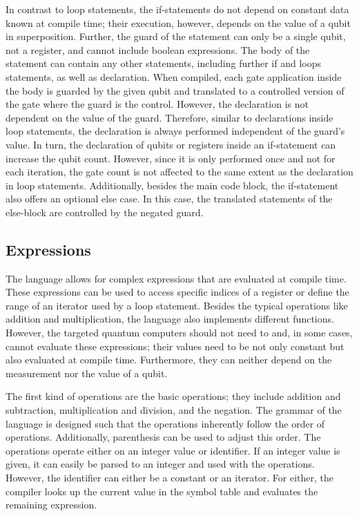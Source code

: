 In contrast to loop statements, the if-statements do not depend on constant data known at compile time; their execution, however, depends on the value of a qubit in superposition. Further, the guard of the statement can only be a single qubit, not a register, and cannot include boolean expressions.
The body of the statement can contain any other statements, including further if and loops statements, as well as declaration. When compiled, each gate application inside the body is guarded by the given qubit and translated to a controlled version of the gate where the guard is the control. However, the declaration is not dependent on the value of the guard. Therefore, similar to declarations inside loop statements, the declaration is always performed independent of the guard's value. In turn, the declaration of qubits or registers inside an if-statement can increase the qubit count. However, since it is only performed once and not for each iteration, the gate count is not affected to the same extent as the declaration in loop statements. Additionally, besides the main code block, the if-statement also offers an optional else case. In this case, the translated statements of the else-block are controlled by the negated guard. 

\subsection{Expressions}
\label{sec:concept_expressions}
The language allows for complex expressions that are evaluated at compile time. These expressions can be used to access specific indices of a register or define the range of an iterator used by a loop statement. Besides the typical operations like addition and multiplication, the language also implements different functions. However, the targeted quantum computers should not need to and, in some cases, cannot evaluate these expressions; their values need to be not only constant but also evaluated at compile time. Furthermore, they can neither depend on the measurement nor the value of a qubit.  

The first kind of operations are the basic operations; they include addition and subtraction, multiplication and division, and the negation. The grammar of the language is designed such that the operations inherently follow the order of operations. Additionally, parenthesis can be used to adjust this order. The operations operate either on an integer value or identifier. If an integer value is given, it can easily be parsed to an integer and used with the operations. However, the identifier can either be a constant or an iterator. For either, the compiler looks up the current value in the symbol table and evaluates the remaining expression. 

